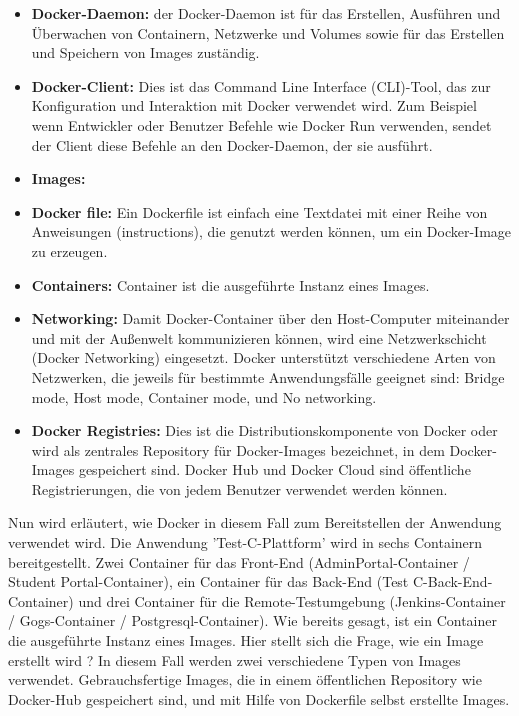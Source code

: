 \documentclass[a4paper,12pt,oneside]{book}
\begin{document}
\begin{itemize}
	\item \textbf{Docker-Daemon: }der Docker-Daemon ist für das Erstellen, Ausführen und Überwachen von Containern, Netzwerke und Volumes sowie für das Erstellen und Speichern von Images zuständig.
	\item \textbf{Docker-Client: }Dies ist das Command Line Interface (CLI)-Tool, das zur Konfiguration und Interaktion mit Docker verwendet wird. Zum Beispiel wenn Entwickler oder Benutzer Befehle wie Docker Run verwenden, sendet der Client diese Befehle an den Docker-Daemon, der sie ausführt.
	\item \textbf{Images: }
	\item \textbf{Docker file: }Ein Dockerfile ist einfach eine Textdatei mit einer Reihe von Anweisungen (instructions), die genutzt werden können, um ein Docker-Image zu erzeugen.
	\item \textbf{Containers: }Container ist die ausgeführte Instanz eines Images.
	\item \textbf{Networking: }Damit Docker-Container über den Host-Computer miteinander und mit der Außenwelt kommunizieren können, wird eine Netzwerkschicht (Docker Networking) eingesetzt. Docker unterstützt verschiedene Arten von Netzwerken, die jeweils für bestimmte Anwendungsfälle geeignet sind: Bridge mode, Host mode, Container mode, und No networking.
	\item \textbf{Docker Registries: }Dies ist die Distributionskomponente von Docker oder wird als zentrales Repository für Docker-Images bezeichnet, in dem Docker-Images gespeichert sind. Docker Hub und Docker Cloud sind öffentliche Registrierungen, die von jedem Benutzer verwendet werden können. 
\end{itemize}
Nun wird erläutert, wie Docker in diesem Fall zum Bereitstellen der Anwendung verwendet wird. Die Anwendung 'Test-C-Plattform' wird in sechs Containern bereitgestellt. Zwei Container für das Front-End (AdminPortal-Container / Student Portal-Container), ein Container für das Back-End (Test C-Back-End-Container) und drei Container für die Remote-Testumgebung (Jenkins-Container / Gogs-Container / Postgresql-Container).
\newline
Wie bereits gesagt, ist ein Container die ausgeführte Instanz eines Images. Hier stellt sich die Frage, wie ein Image erstellt wird ?
\newline
In diesem Fall werden zwei verschiedene Typen von Images verwendet. Gebrauchsfertige Images, die in einem öffentlichen Repository wie Docker-Hub gespeichert sind, und mit Hilfe von Dockerfile selbst erstellte Images.
\end{document}
